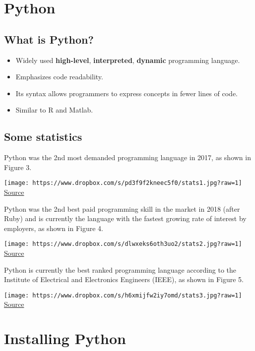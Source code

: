 \documentclass[11pt]{article}
\makeatletter
\def\maxwidth{\ifdim\Gin@nat@width>\linewidth\linewidth
    \else\Gin@nat@width\fi}
\let\Oldincludegraphics\includegraphics
\renewcommand{\includegraphics}[1]{\Oldincludegraphics[width=.8\maxwidth]{#1}}
\providecommand{\tightlist}{%
      \setlength{\itemsep}{0pt}\setlength{\parskip}{0pt}}
\makeatother
\begin{document}
    \section{Python}\label{python}

    \subsection{What is Python?}\label{what-is-python}

\begin{itemize}
\tightlist
\item
  Widely used \textbf{high-level}, \textbf{interpreted},
  \textbf{dynamic} programming language.
\item
  Emphasizes code readability.
\item
  Its syntax allows programmers to express concepts in fewer lines of
  code.
\item
  Similar to R and Matlab.
\end{itemize}

    \subsection{Some statistics}\label{some-statistics}

    Python was the 2nd most demanded programming language in 2017, as shown
in Figure 3.

    \texttt{[image: https://www.dropbox.com/s/pd3f9f2kneec5f0/stats1.jpg?raw=1]}
\href{https://www.codingdojo.com/blog/7-most-in-demand-programming-languages-of-2018/}{Source}

    Python was the 2nd best paid programming skill in the market in 2018
(after Ruby) and is currently the language with the fastest growing rate
of interest by employers, as shown in Figure 4.

    \texttt{[image: https://www.dropbox.com/s/dlwxeks6oth3uo2/stats2.jpg?raw=1]}
\href{https://medium.freecodecamp.org/best-programming-languages-to-learn-in-2018-ultimate-guide-bfc93e615b35}{Source}

    Python is currently the best ranked programming language according to
the Institute of Electrical and Electronics Engineers (IEEE), as shown
in Figure 5.

    \texttt{[image: https://www.dropbox.com/s/h6xmijfw2iy7omd/stats3.jpg?raw=1]}
\href{https://spectrum.ieee.org/at-work/innovation/the-2018-top-programming-languages}{Source}

    \section{Installing Python}\label{installing-python}
\end{document}
